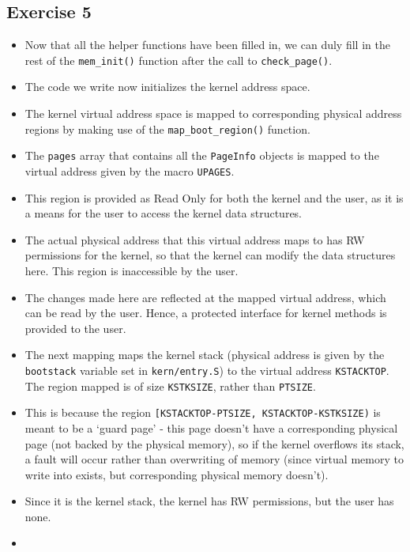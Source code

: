 \documentclass[]{article}
\begin{document}
\subsection{Exercise 5}

\begin{itemize}
\itemsep1pt\parskip0pt
\item
  Now that all the helper functions have been filled in, we can duly
  fill in the rest of the \texttt{mem\_init()} function after the call
  to \texttt{check\_page()}.
\item
  The code we write now initializes the kernel address space.
\item
  The kernel virtual address space is mapped to corresponding physical
  address regions by making use of the \texttt{map\_boot\_region()}
  function.
\item
  The \texttt{pages} array that contains all the \texttt{PageInfo}
  objects is mapped to the virtual address given by the macro
  \texttt{UPAGES}.
\item
  This region is provided as Read Only for both the kernel and the user,
  as it is a means for the user to access the kernel data structures.
\item
  The actual physical address that this virtual address maps to has RW
  permissions for the kernel, so that the kernel can modify the data
  structures here. This region is inaccessible by the user.
\item
  The changes made here are reflected at the mapped virtual address,
  which can be read by the user. Hence, a protected interface for kernel
  methods is provided to the user.
\item
  The next mapping maps the kernel stack (physical address is given by
  the \texttt{bootstack} variable set in \texttt{kern/entry.S}) to the
  virtual address \texttt{KSTACKTOP}. The region mapped is of size
  \texttt{KSTKSIZE}, rather than \texttt{PTSIZE}.
\item
  This is because the region
  \texttt{{[}KSTACKTOP-PTSIZE, KSTACKTOP-KSTKSIZE)} is meant to be a
  `guard page' - this page doesn't have a corresponding physical page
  (not backed by the physical memory), so if the kernel overflows its
  stack, a fault will occur rather than overwriting of memory (since
  virtual memory to write into exists, but corresponding physical memory
  doesn't).
\item
  Since it is the kernel stack, the kernel has RW permissions, but the
  user has none.
\item

\end{itemize}
\end{document}
